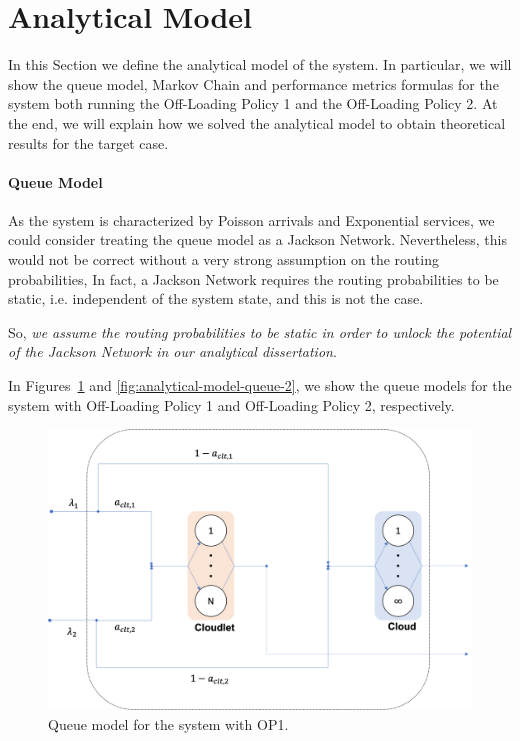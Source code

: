 \section{Analytical Model}
\label{sec:analytical-model}
In this Section we define the analytical model of the system.
%
In particular, we will show the queue model, Markov Chain and performance metrics formulas for the system both running the Off-Loading Policy 1 and the Off-Loading Policy 2.
%
At the end, we will explain how we solved the analytical model to obtain theoretical results for the target case.

\paragraph{Queue Model}
As the system is characterized by Poisson arrivals and Exponential services, we could consider treating the queue model as a Jackson Network. 
Nevertheless, this would not be correct without a very strong assumption on the routing probabilities, In fact, a Jackson Network requires the routing probabilities  to be static, i.e. independent of the system state, and this is not the case.

So, \textit{we assume the routing probabilities to be static in order to unlock the potential of the Jackson Network in our analytical dissertation}.

In Figures~\ref{fig:analytical-model-queue-1} and \ref{fig:analytical-model-queue-2}, we show the queue models for the system with Off-Loading Policy 1 and Off-Loading Policy 2, respectively.

\begin{figure}
	\includegraphics[width=\columnwidth]{fig/analytical-model-queue-1}
	\caption{Queue model for the system with OP1.}
	\label{fig:analytical-model-queue-1}
\end{figure}

